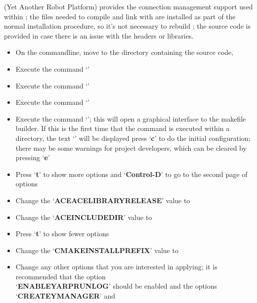 \tertiaryEnd{}
\TBD{}
\tertiaryEnd{}
\TBD{}
\tertiaryEnd{}
\secondaryEnd{}
\textbf{\yarp} (Yet Another Robot Platform) provides the connection management support
used within \mplusm{}; the files needed to compile and link with \yarp{} are installed as
part of the normal \mplusm{} installation procedure, so it's not necessary to rebuild
\yarp{}; the source code is provided in case there is an issue with the headers or
libraries.
\begin{itemize}
\item On the command\longDash{}line, move to the directory containing the \mplusm{} source
code, 
\item\exSp{} Execute the command `'
\item\exSp{} Execute the command `'
\item\exSp{} Execute the command `'
\item\exSp{} Execute the command `'; this will open a graphical
interface to the makefile builder. If this is the first time that the command is executed
within a directory, the text `' will be displayed \longDash{} press
`\textbf{c}' to do the initial configuration; there may be some warnings for project
developers, which can be cleared by pressing `\textbf{e}'
\item\exSp{} Press `\textbf{t}' to show more options and `\textbf{Control-D}' to go to the
second page of options
\item\exSp{} Change the `\textbf{ACE\fUS{}ACE\fUS{}LIBRARY\fUS{}RELEASE}' value to
\item\exSp{} Change the `\textbf{ACE\fUS{}INCLUDE\fUS{}DIR}' value to
\item\exSp{} Press `\textbf{t}' to show fewer options
\item\exSp{} Change the `\textbf{CMAKE\fUS{}INSTALL\fUS{}PREFIX}' value to
\item\exSp{} Change any other options that you are interested in applying; it is
recommended that the option\\
`\textbf{ENABLE\fUS{}YARPRUN\fUS{}LOG}' should be enabled and the options
`\textbf{CREATE\fUS{}YMANAGER}' and\\

\end{itemize}
